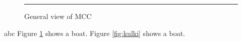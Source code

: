 \documentclass{article}
\begin{document}
    \begin{figure}
       \rule{4cm}{4cm}
      \caption{General view of MCC}
      \label{fig:boat1}
    \end{figure}
abc
\newpage
    Figure \ref{fig:boat1} shows a boat.
    Figure \ref{fig:kulki} shows a boat.
\end{document}
